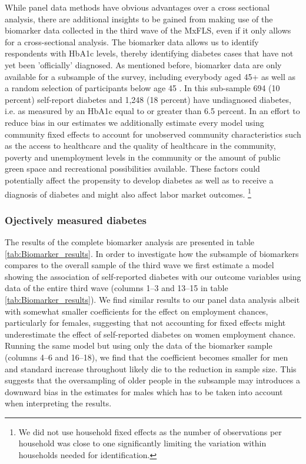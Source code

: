 \documentclass[12pt,english,british]{article}
\begin{document}
While panel data methods have obvious advantages over a cross sectional
analysis, there are additional insights
to be gained from making use of the biomarker data collected in the
third wave of the \ac{MxFLS}, even if it only allows for a cross-sectional
analysis. The biomarker data allows us to identify respondents with
\ac{HbA1c} levels, thereby identifying diabetes cases that have
not yet been 'officially' diagnosed. As mentioned before, biomarker
data are only available for a subsample of the survey, including everybody
aged 45+ as well as a random selection of participants below age 45
\citep{Crimmins2015}. In this sub-sample 694 (10 percent) self-report
diabetes and 1,248 (18 percent) have undiagnosed diabetes, i.e. as
measured by an \ac{HbA1c} equal to or greater than 6.5 percent. In an effort to reduce bias in our estimates we additionally estimate every model using community fixed effects to account for unobserved community characteristics such as the access to healthcare and the quality of healthcare in the community, poverty and unemployment levels in the community or the amount of public green space and recreational possibilities available. These factors could potentially affect the propensity to develop diabetes as well as to receive a diagnosis of diabetes and might also affect labor market outcomes.  \footnote{We did not use household fixed effects as the number of observations per household was close to one significantly limiting the variation within households needed for identification.}


\subsubsection*{Ojectively measured diabetes}


The results of the complete biomarker analysis are presented in table \ref{tab:Biomarker_results}. In order to investigate how the subsample of biomarkers compares to the overall sample of the third wave we first estimate a model showing the association of self-reported diabetes with our outcome variables using data of the entire third wave (columns 1--3 and 13--15 in table \ref{tab:Biomarker_results}). We find similar results to our panel data analysis albeit with somewhat smaller coefficients for the effect on employment chances, particularly for females, suggesting that not accounting for fixed effects might underestimate the effect of self-reported diabetes on women employment chance. Running the same model but using only the data of the biomarker sample (columns 4--6 and 16--18), we find that the coefficient becomes smaller for men and standard increase throughout likely die to the reduction in sample size. This suggests that the oversampling of older people in the subsample may introduces a downward bias in the estimates for males which has to be taken into account when interpreting the results.
\end{document}
